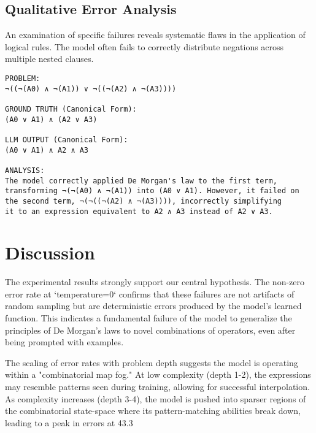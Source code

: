 \documentclass[11pt,a4paper]{article}
\begin{document}
\subsection{Qualitative Error Analysis}
An examination of specific failures reveals systematic flaws in the application of logical rules. The model often fails to correctly distribute negations across multiple nested clauses.

\begin{verbatim}
PROBLEM:
¬((¬(A0) ∧ ¬(A1)) ∨ ¬((¬(A2) ∧ ¬(A3))))

GROUND TRUTH (Canonical Form):
(A0 ∨ A1) ∧ (A2 ∨ A3)

LLM OUTPUT (Canonical Form):
(A0 ∨ A1) ∧ A2 ∧ A3

ANALYSIS:
The model correctly applied De Morgan's law to the first term,
transforming ¬(¬(A0) ∧ ¬(A1)) into (A0 ∨ A1). However, it failed on 
the second term, ¬(¬((¬(A2) ∧ ¬(A3)))), incorrectly simplifying 
it to an expression equivalent to A2 ∧ A3 instead of A2 ∨ A3.
\end{verbatim}

\section{Discussion}
The experimental results strongly support our central hypothesis. The non-zero error rate at `temperature=0` confirms that these failures are not artifacts of random sampling but are deterministic errors produced by the model's learned function. This indicates a fundamental failure of the model to generalize the principles of De Morgan's laws to novel combinations of operators, even after being prompted with examples.

The scaling of error rates with problem depth suggests the model is operating within a "combinatorial map fog." At low complexity (depth 1-2), the expressions may resemble patterns seen during training, allowing for successful interpolation. As complexity increases (depth 3-4), the model is pushed into sparser regions of the combinatorial state-space where its pattern-matching abilities break down, leading to a peak in errors at 43.3%
\end{document}
